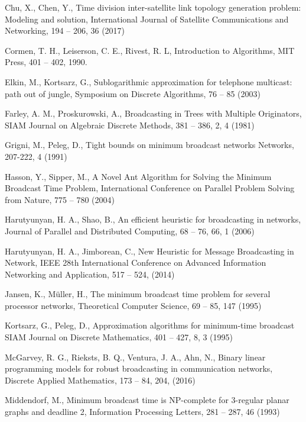 \documentclass[preprint,12pt, review]{elsarticle}
\begin{document}
\begin{thebibliography}{}
%
%
Chu, X., Chen, Y.,
Time division inter-satellite link topology generation problem: Modeling and solution,
International Journal of Satellite Communications and Networking, 194 -- 206, 36 (2017)

Cormen, T. H., Leiserson, C. E., Rivest, R. L,
Introduction to Algorithms, 
MIT Press, 401 -- 402, 1990. 

Elkin, M., Kortsarz, G.,
Sublogarithmic approximation for telephone multicast: path out of jungle,
Symposium on Discrete Algorithms, 76 -- 85 (2003)

Farley, A. M., Proskurowski, A.,
Broadcasting in Trees with Multiple Originators,
SIAM Journal on Algebraic Discrete Methods, 381 -- 386, 2, 4 (1981)

Grigni, M., Peleg, D.,
Tight bounds on minimum broadcast networks
Networks, 207-222, 4 (1991)

Hasson, Y., Sipper, M.,
A Novel Ant Algorithm for Solving the Minimum Broadcast Time Problem,
International Conference on Parallel Problem Solving from Nature, 775 -- 780 (2004)

Harutyunyan, H. A., Shao, B.,
An efficient heuristic for broadcasting in networks,
Journal of Parallel and Distributed Computing, 68 -- 76, 66, 1 (2006)

Harutyunyan, H. A., Jimborean, C.,
New Heuristic for Message Broadcasting in Network,
IEEE 28th International Conference on Advanced Information Networking and Application, 517 -- 524, (2014)

Jansen, K., M\"uller, H.,
The minimum broadcast time problem for several processor networks, 
Theoretical Computer Science, 69 -- 85, 147 (1995)

Kortsarz, G., Peleg, D.,
Approximation algorithms for minimum-time broadcast
SIAM Journal on Discrete Mathematics, 401 -- 427, 8, 3 (1995)

McGarvey, R. G., Rieksts, B. Q., Ventura, J. A., Ahn, N.,
Binary linear programming models for robust broadcasting in communication networks,
Discrete Applied Mathematics, 173 -- 84, 204, (2016)

Middendorf, M.,
Minimum broadcast time is NP-complete for 3-regular planar graphs and deadline 2,
Information Processing Letters, 281 -- 287, 46 (1993)


\end{thebibliography}
\end{document}

